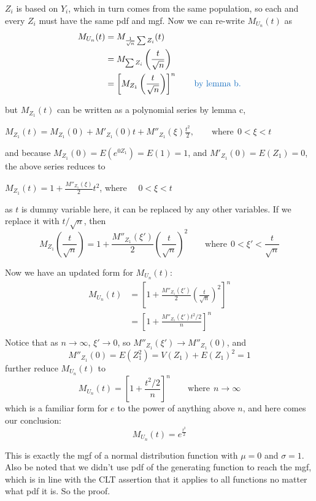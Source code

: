 \documentclass[11pt]{article}
\begin{document}
$Z_i$ is based on $Y_i$,  which in turn comes from the same population,  so each and every $Z_i$ must have the same pdf and mgf.  Now we can re-write $M_{U_n} (t)$ as
\[
\begin{aligned}
M_{U_n} (t)
	&= M_{\frac{1}{\sqrt{n} } \sum Z_i} (t) \\
	&= M_{\sum Z_i} \left( \frac{t}{\sqrt{n}} \right) \\
	&= \left[ M_{Z_1} \left(  \frac{t}{\sqrt{n}} \right) \right] ^n \qquad  \text{\color{RoyalBlue} by lemma b.} \\
\end{aligned}
\]

but $M_{Z_1} (t)$ can be written as a polynomial series by lemma c,
\begin{center}
$ M_{Z_1} (t) = M_{Z_1} (0) + M'_{Z_1} (0) t + M''_{Z_1} (\xi) \frac{t^2}{2} ,  \qquad \text{where} \ \ 0<\xi<t$
\end{center}

and because $M_{Z_1} (0) = E(e^{0Z_1}) = E(1) = 1$,  and $M' _{Z_1} (0) = E(Z_1) = 0$,  the above series reduces to
\begin{center}
$M_{Z_1} (t) = 1 + \displaystyle \frac {M''_{Z_1} (\xi)} {2} t^2$,  \qquad where \ \ $0<\xi<t$
\end{center}
as $t$ is dummy variable here,  it can be replaced by any other variables.  If we replace it with $t/ \sqrt{n}$,  then
$$
M_{Z_1} \left(  \frac{t}{\sqrt{n}} \right) = 1 + \frac {M''_{Z_1} (\xi')} {2} \left( \frac{t}{\sqrt{n}} \right)^2  \qquad \text{where} \ \ 0<\xi'< \frac{t}{\sqrt{n}}
$$

Now we have an updated form for $M_{U_n} (t)$:
\[
\begin{aligned}
M_{U_n} (t)
	&= \left[ 1 + \frac {M''_{Z_1} (\xi')} {2} \left( \frac{t}{\sqrt{n}} \right)^2 \right] ^n \\
	&= \left[ 1 + \frac {M''_{Z_1} (\xi') t^2 /2} {n} \right] ^n \\
\end{aligned}
\]
Notice that as $n \to \infty$, $\xi' \to 0$,  so $M'' _{Z_1} (\xi') \to M'' _{Z_1} (0) $,  and
$$
M'' _{Z_1} (0) = E(Z_1^2) = V(Z_1) + E(Z_1)^2 = 1
$$
further reduce $M_{U_n} (t)$ to
$$
M_{U_n} (t) = \left[ 1 + \frac {t^2 /2} {n} \right] ^n  \qquad \text{where} \ \ n \to \infty
$$
which is a familiar form for $e$ to the power of anything above $n$,  and here comes our conclusion: 
$$
M_{U_n} (t) = e^{\frac{t^2}{2}}
$$

This is exactly the mgf of a normal distribution function with $\mu=0$ and $\sigma=1$.  Also be noted that we didn't use pdf of the generating function to reach the mgf,  which is in line with the CLT assertion that it applies to all functions no matter what pdf it is.  So the proof.














\clearpage

\printbibliography [title={Reference}]


\end{document}
